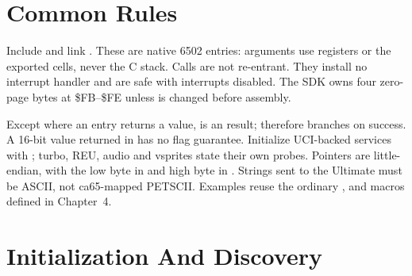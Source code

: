 

\begin{referencechapter}

\newcommand{\asmref}[7]{%
  \asmapi{#1}%
  \entryfield{Call}{\cmd{jsr #1}}%
  \entryhead{Inputs}#2\par
  \entryhead{Outputs}#3\par
  \entryhead{Clobbers}Registers not listed as outputs are undefined;
  processor flags and the four bytes at \cmd{UCI\_ZP} may change. #4\par
  \entryhead{Purpose}#5\par
  \entryhead{Example}%
  \begin{listingbox}[before skip=0.3\baselineskip,after skip=0.3\baselineskip]#6\end{listingbox}%
  \begin{resultbox}#7\end{resultbox}}

\section{Common Rules}

Include  and link . These are native 6502
entries: arguments use registers or the exported  cells, never the
C stack. Calls are not re-entrant. They install no interrupt handler and are
safe with interrupts disabled. The SDK owns four zero-page bytes at \$FB--\$FE
unless  is changed before assembly.

Except where an entry returns a value,  is an  result;
 therefore branches on success. A 16-bit value returned in 
has no flag guarantee. Initialize UCI-backed services with
; turbo, REU, audio and vsprites state their own probes.
Pointers are little-endian, with the low byte in  and high byte in
. Strings sent to the Ultimate must be ASCII, not ca65-mapped PETSCII.
Examples reuse the ordinary ,  and 
macros defined in Chapter~4.

\section{Initialization And Discovery}


\end{referencechapter}
